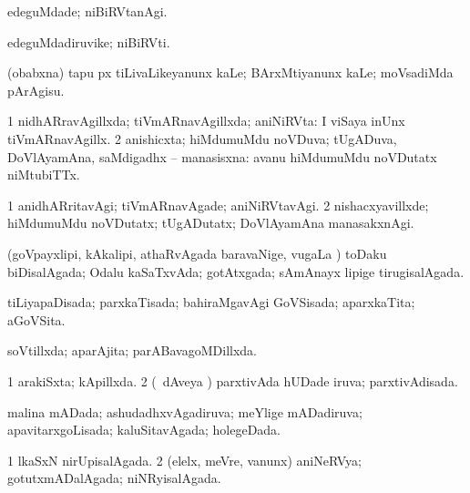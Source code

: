 {\bentry
{} 
\gl{\kirxvi}
\expl{}
\bmng
 edeguMdade; niBiRVtanAgi. 
\emng
\eentry

\bentry
{} 
\gl{\nA}
\expl{}
\bmng
 edeguMdadiruvike; niBiRVti. 
\emng
\eentry

\bentry
{} 
\gl{\nA}
\expl{}
\bmng
\emng
\eentry

\bentry
{} 
\gl{\sakirx}
\expl{}
\bmng
 (obabxna) tapu px tiLivaLikeyanunx kaLe; BArxMtiyanunx kaLe; moVsadiMda pArAgisu. 
\emng
\eentry

\bentry
{} 
\gl{\gu}
\expl{}
\bmng
\bnum
\num{1} nidhARravAgillxda; tiVmARnavAgillxda; aniNiRVta:  I viSaya inUnx tiVmARnavAgillx. 
\num{2} anishicxta; hiMdumuMdu noVDuva; tUgADuva, DoVlAyamAna, saMdigadhx -- manasisxna:  avanu hiMdumuMdu noVDutatx niMtubiTTx. 
\enum
\emng
\eentry

\bentry
{} 
\gl{\kirxvi}
\expl{}
\bmng
\bnum
\num{1} anidhARritavAgi; tiVmARnavAgade; aniNiRVtavAgi. 
\num{2} nishacxyavillxde; hiMdumuMdu noVDutatx; tUgADutatx; DoVlAyamAna manasakxnAgi. 
\enum
\emng
\eentry

\bentry
{} 
\gl{\gu}
\expl{}
\bmng
 (goVpayxlipi, kAkalipi, athaRvAgada baravaNige, \mo vugaLa \vi) toDaku biDisalAgada; Odalu kaSaTxvAda; gotAtxgada; sAmAnayx lipige tirugisalAgada. 
\emng
\eentry

\bentry
{} 
\gl{\gu}
\expl{}
\bmng
 tiLiyapaDisada; parxkaTisada; bahiraMgavAgi GoVSisada; aparxkaTita; aGoVSita. 
\emng
\eentry

\bentry
{} 
\gl{\gu}
\expl{}
\bmng
 soVtillxda; aparAjita; parABavagoMDillxda. 
\emng
\eentry

\bentry
{} 
\gl{\gu}
\expl{}
\bmng
\bnum
\num{1} arakiSxta; kApillxda. 
\num{2} (\kanmu\ dAveya \vi) parxtivAda hUDade iruva; parxtivAdisada. 
\enum
\emng
\eentry

\bentry
{} 
\gl{\gu}
\expl{}
\bmng
 malina mADada; ashudadhxvAgadiruva; meYlige mADadiruva; apavitarxgoLisada; kaluSitavAgada; holegeDada. 
\emng
\eentry

\bentry
{} 
\gl{\gu}
\expl{}
\bmng
\bnum
\num{1} lkaSxN nirUpisalAgada. 
\num{2} (elelx, meVre, \mo vanunx) aniNeRVya; gotutxmADalAgada; niNRyisalAgada. 
\enum
\emng
\eentry

}
